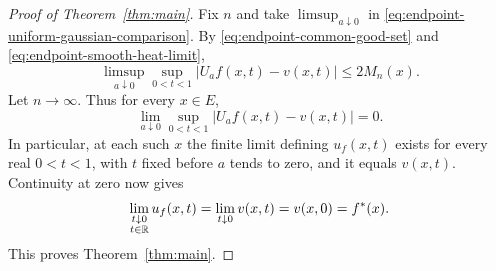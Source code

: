 \begin{proof}[Proof of Theorem~\ref{thm:main}]
Fix $n$ and take $\limsup_{a\downarrow0}$ in
\eqref{eq:endpoint-uniform-gaussian-comparison}.  By
\eqref{eq:endpoint-common-good-set} and
\eqref{eq:endpoint-smooth-heat-limit},
\[
 \limsup_{a\downarrow0}\sup_{0<t<1}|U_af(x,t)-v(x,t)|
        \le2M_n(x).
\]
Let $n\to\infty$.  Thus for every $x\in E$,
\begin{equation}
 \lim_{a\downarrow0}\sup_{0<t<1}|U_af(x,t)-v(x,t)|=0.
 \label{eq:endpoint-uniform-gaussian-limit}
\end{equation}
In particular, at each such $x$ the finite limit defining $u_f(x,t)$
exists for every real $0<t<1$, with $t$ fixed before $a$ tends to zero,
and it equals $v(x,t)$.  Continuity at zero now gives
\[
 \lim_{\substack{t\downarrow0\\t\in\mathbb R}}u_f(x,t)
     =\lim_{t\downarrow0}v(x,t)=v(x,0)=f^*(x).
\]
This proves Theorem~\ref{thm:main}.
\end{proof}
